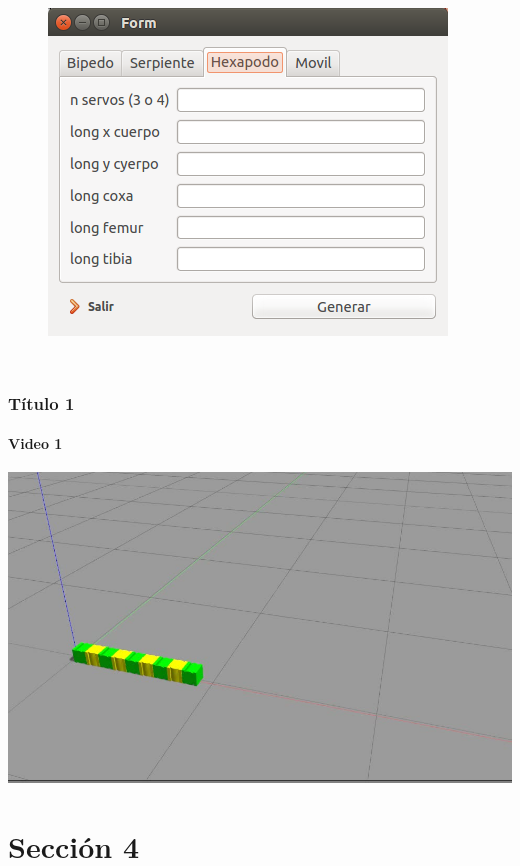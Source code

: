 \documentclass{beamer}
\begin{document}
\begin{frame}[fragile]
\begin{columns}[c]
			\begin{figure}[htb]
				\centering
				\includegraphics[width = 1\linewidth]{imagenes/generador_urdf.png}
				\label{Figura3_83}
			\end{figure}
	\end{columns}	
\end{frame}



\begin{frame}
	\frametitle{Título 1}
	\framesubtitle{Video 1}
	\href{run:videos/ser.avi?autostart&loop}{\includegraphics[width=0.8\linewidth,keepaspectratio]{videos/ser.jpg}} 
\end{frame}

\section{Sección 4}
\end{document}
